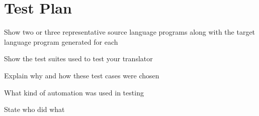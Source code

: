 \chapter{Test Plan}

Show two or three representative source language programs along with the target language program generated for each

Show the test suites used to test your translator

Explain why and how these test cases were chosen

What kind of automation was used in testing

State who did what
